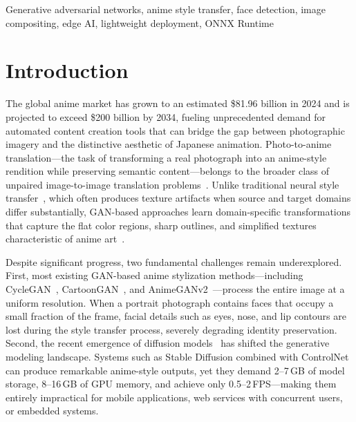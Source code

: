 \documentclass[journal]{IEEEtran}
\begin{document}
\begin{IEEEkeywords}
Generative adversarial networks, anime style transfer, face detection, image compositing, edge AI, lightweight deployment, ONNX Runtime
\end{IEEEkeywords}

\section{Introduction}
\label{sec:intro}

The global anime market has grown to an estimated \$81.96 billion in 2024 and is projected to exceed \$200 billion by 2034, fueling unprecedented demand for automated content creation tools that can bridge the gap between photographic imagery and the distinctive aesthetic of Japanese animation. Photo-to-anime translation---the task of transforming a real photograph into an anime-style rendition while preserving semantic content---belongs to the broader class of unpaired image-to-image translation problems~\cite{Zhu2017, Isola2017}. Unlike traditional neural style transfer~\cite{Johnson2016}, which often produces texture artifacts when source and target domains differ substantially, GAN-based approaches learn domain-specific transformations that capture the flat color regions, sharp outlines, and simplified textures characteristic of anime art~\cite{Chen2018CartoonGAN, Chen2020, Liu2024}.

Despite significant progress, two fundamental challenges remain underexplored. First, most existing GAN-based anime stylization methods---including CycleGAN~\cite{Zhu2017}, CartoonGAN~\cite{Chen2018CartoonGAN}, and AnimeGANv2~\cite{ChenLiu2020}---process the entire image at a uniform resolution. When a portrait photograph contains faces that occupy a small fraction of the frame, facial details such as eyes, nose, and lip contours are lost during the style transfer process, severely degrading identity preservation. Second, the recent emergence of diffusion models~\cite{Ho2020, Rombach2022} has shifted the generative modeling landscape. Systems such as Stable Diffusion combined with ControlNet~\cite{Zhang2023ControlNet} can produce remarkable anime-style outputs, yet they demand 2--7\,GB of model storage, 8--16\,GB of GPU memory, and achieve only 0.5--2\,FPS---making them entirely impractical for mobile applications, web services with concurrent users, or embedded systems.
\end{document}
